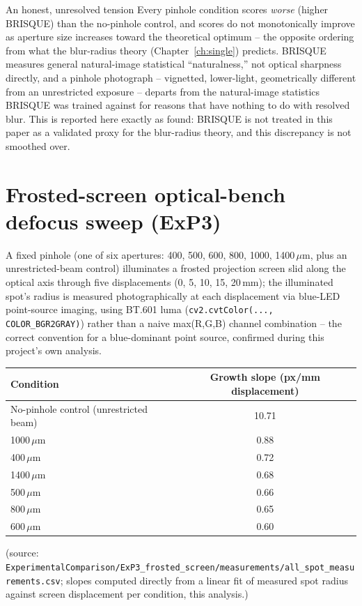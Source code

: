 \begin{warnbox}{An honest, unresolved tension}
Every pinhole condition scores \emph{worse} (higher BRISQUE) than the no-pinhole
control, and scores do not monotonically improve as aperture size increases toward the
theoretical optimum -- the opposite ordering from what the blur-radius theory
(Chapter~\ref{ch:single}) predicts. BRISQUE measures general natural-image statistical
``naturalness,'' not optical sharpness directly, and a pinhole photograph -- vignetted,
lower-light, geometrically different from an unrestricted exposure -- departs from the
natural-image statistics BRISQUE was trained against for reasons that have nothing to
do with resolved blur. This is reported here exactly as found: BRISQUE is not treated in
this paper as a validated proxy for the blur-radius theory, and this discrepancy is not
smoothed over.
\end{warnbox}

\section{Frosted-screen optical-bench defocus sweep (ExP3)}
\label{sec:exp3}
A fixed pinhole (one of six apertures: 400, 500, 600, 800, 1000, 1400\,$\mu$m, plus an
unrestricted-beam control) illuminates a frosted projection screen slid along the
optical axis through five displacements (0, 5, 10, 15, 20\,mm); the illuminated spot's
radius is measured photographically at each displacement via blue-LED point-source
imaging, using BT.601 luma (\texttt{cv2.cvtColor(..., COLOR\_BGR2GRAY)}) rather than a
naive max(R,G,B) channel combination -- the correct convention for a blue-dominant
point source, confirmed during this project's own analysis.

\begin{center}
\begin{tabular}{lc}
\toprule
Condition & Growth slope (px/mm displacement) \\
\midrule
No-pinhole control (unrestricted beam) & 10.71 \\
1000\,$\mu$m & 0.88 \\
400\,$\mu$m & 0.72 \\
1400\,$\mu$m & 0.68 \\
500\,$\mu$m & 0.66 \\
800\,$\mu$m & 0.65 \\
600\,$\mu$m & 0.60 \\
\bottomrule
\end{tabular}
\end{center}
(source: \texttt{ExperimentalComparison/ExP3\_frosted\_screen/measurements/all\_spot\_measurements.csv};
slopes computed directly from a linear fit of measured spot radius against screen
displacement per condition, this analysis.)

